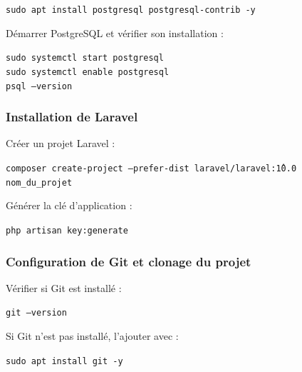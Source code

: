 \begin{tcolorbox}[colback=black, coltext=white, title=Installation de PostgreSQL, fonttitle=\bfseries]
\texttt{sudo apt install postgresql postgresql-contrib -y}
\end{tcolorbox}

Démarrer PostgreSQL et vérifier son installation :

\begin{tcolorbox}[colback=black, coltext=white, title=Démarrage et vérification, fonttitle=\bfseries]
\texttt{sudo systemctl start postgresql} \\
\texttt{sudo systemctl enable postgresql} \\
\texttt{psql --version}
\end{tcolorbox}

\subsubsection*{Installation de Laravel}
Créer un projet Laravel :

\begin{tcolorbox}[colback=black, coltext=white, title=Création d’un projet Laravel, fonttitle=\bfseries]
\texttt{composer create-project --prefer-dist laravel/laravel:\^10.0 nom\_du\_projet}
\end{tcolorbox}

Générer la clé d’application :

\begin{tcolorbox}[colback=black, coltext=white, title=Génération de la clé d’application, fonttitle=\bfseries]
\texttt{php artisan key:generate}
\end{tcolorbox}

\subsubsection{Configuration de Git et clonage du projet}
Vérifier si Git est installé :

\begin{tcolorbox}[colback=black, coltext=white, title=Vérification de Git, fonttitle=\bfseries]
\texttt{git --version}
\end{tcolorbox}

Si Git n’est pas installé, l’ajouter avec :

\begin{tcolorbox}[colback=black, coltext=white, title=Installation de Git, fonttitle=\bfseries]
\texttt{sudo apt install git -y}
\end{tcolorbox}

